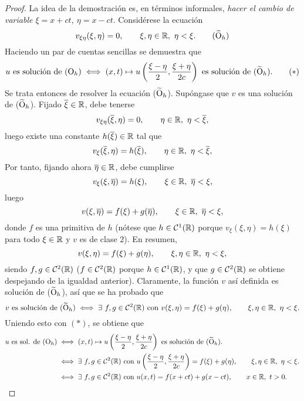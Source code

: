 \documentclass[a4paper, 12pt, extrafontsizes]{memoir}
\begin{document}
\begin{proof}
    La idea de la demostración es, en términos informales, \emph{hacer el cambio de variable $\xi = x+ct$, $\eta = x-ct$}. Considérese la ecuación
    \[v_{\xi \eta}(\xi, \eta) = 0, \qquad \xi,\eta \in \R, \ \eta < \xi. \tag{$\widetilde{\textup{O}}_h$}\]
    Haciendo un par de cuentas sencillas se demuestra que
    \[u \textup{ es solución de ($\textup{O}_h$)} \iff (x,t) \mapsto u\left(\frac{\xi-\eta}{2},\frac{\xi+\eta}{2c}\right) \textup{ es solución de ($\widetilde{\textup{O}}_h$).} \tag{$\ast$}\]
    Se trata entonces de resolver la ecuación ($\widetilde{\textup{O}}_h$). Supóngase que $v$ es una solución de ($\widetilde{\textup{O}}_h$). Fijado $\overline{\xi} \in \mathbb R$, debe tenerse
    \[v_{\xi\eta}(\overline{\xi},\eta) = 0, \qquad \eta \in \mathbb R, \ \eta < \overline{\xi},\]
    luego existe una constante $h(\overline{\xi})\in \mathbb R$ tal que
    \[v_\xi(\overline{\xi},\eta) = h(\overline{\xi}), \qquad \eta \in \mathbb R, \ \eta < \overline{\xi},\]
    Por tanto, fijando ahora $\overline{\eta} \in \mathbb R$, debe cumplirse
    \[v_\xi(\xi,\overline{\eta}) = h(\xi), \qquad \xi \in \mathbb R, \ \overline{\eta} < \xi,\]
    luego 
    \[v(\xi, \overline{\eta}) = f(\xi) + g(\overline{\eta}), \qquad \xi \in \mathbb R, \ \overline{\eta} < \xi,\]
    donde $f$ es una primitiva de $h$ (nótese que $h \in \mathcal{C}^1(\mathbb R)$ porque $v_\xi(\xi,\eta) = h(\xi)$ para todo $\xi \in \mathbb R$ y $v$ es de clase $2$). En resumen,
    \[v(\xi, \eta) = f(\xi) + g(\eta), \qquad \xi,\eta \in \mathbb R, \ \eta < \xi,\]
    siendo $f,g \in \mathcal{C}^2(\mathbb R)$ ($f \in \mathcal{C}^2(\mathbb R)$ porque $h \in \mathcal{C}^1(\mathbb R)$, y que $g \in \mathcal{C}^2(\mathbb R)$ se obtiene despejando de la igualdad anterior). Claramente, la función $v$ así definida es solución de ($\widetilde{\textup{O}}_h$), así que se ha probado que
    \[v \textup{ es solución de ($\widetilde{\textup{O}}_h$)} \iff \exists \ f,g \in \mathcal{C}^2(\R) \textup{ con } v(\xi,\eta) = f(\xi)+g(\eta), \qquad \xi,\eta \in \R, \ \eta < \xi.\]
    Uniendo esto con $(\ast)$, se obtiene que
    \begin{align*}
        u \textup{ es sol. de ($\textup{O}_h$)} &\iff(x,t) \mapsto u\left(\frac{\xi-\eta}{2},\frac{\xi+\eta}{2c}\right) \textup{ es solución de ($\widetilde{\textup{O}}_h$).} \\ &\iff \exists \ f,g \in \mathcal{C}^2(\mathbb R) \textup{ con } u\left(\frac{\xi-\eta}{2},\frac{\xi+\eta}{2c}\right) = f(\xi)+g(\eta), \qquad \xi,\eta \in \mathbb R, \ \eta < \xi. \\
        &\iff \exists \ f,g \in \mathcal{C}^2(\mathbb R) \textup{ con } u(x,t) = f(x+ct)+g(x-ct), \qquad x \in \mathbb R, \ t > 0. \qedhere
    \end{align*}
\end{proof}
\end{document}
